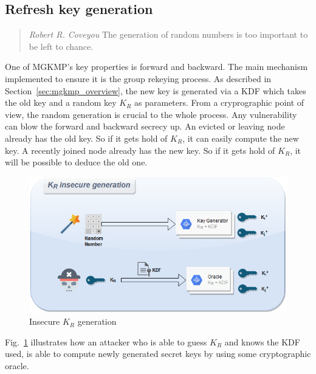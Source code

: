 \subsection{Refresh key generation}
\label{subsec:random_gen}

\begin{quote}{\emph{Robert R. Coveyou}}
	The generation of random numbers is too important
to be left to chance.
\end{quote}


One of MGKMP's key properties is forward and backward. The main mechanism implemented to ensure it is the group rekeying process. As described in Section~\ref{sec:mgkmp_overview}, the new key is generated via a KDF which takes the old key and a random key $K_R$ as parameters. From a cryprographic point of view, the random generation is crucial to the whole process. Any vulnerability can blow the forward and backward secrecy up. An evicted or leaving node already has the old key. So if it gets hold of $K_R$, it can easily compute the new key. A recently joined node already has the new key. So if it gets hold of $K_R$, it will be possible to deduce the old one.

\begin{figure}[htbp]
	\centerline{\includegraphics[scale=0.60]{figures/mgkmp/random.png}}
	\caption{Insecure $K_R$ generation}
	\label{fig:random_gen}
\end{figure}

Fig.~\ref{fig:random_gen} illustrates how an attacker who is able to guess $K_R$ and knows the KDF used, is able to compute newly generated secret keys by using some cryptographic oracle.

